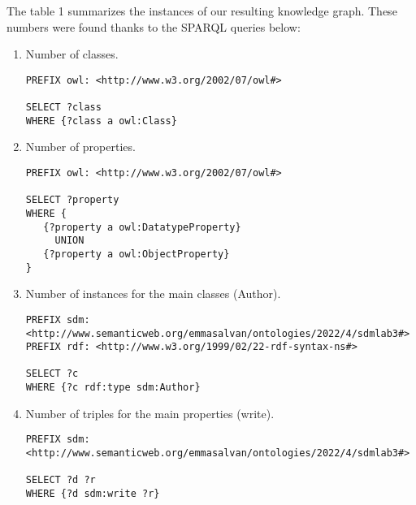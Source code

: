 The table 1 summarizes the instances of our resulting knowledge graph. These numbers were found thanks to the SPARQL queries below: 
\begin{enumerate}
\item Number of classes.
\begin{verbatim}
PREFIX owl: <http://www.w3.org/2002/07/owl#>

SELECT ?class 
WHERE {?class a owl:Class}
\end{verbatim}
\item Number of properties.
\begin{verbatim}
PREFIX owl: <http://www.w3.org/2002/07/owl#>

SELECT ?property 
WHERE {
   {?property a owl:DatatypeProperty}
     UNION
   {?property a owl:ObjectProperty}
}
\end{verbatim}
\item Number of instances for the main classes (Author).
\begin{verbatim}
PREFIX sdm: <http://www.semanticweb.org/emmasalvan/ontologies/2022/4/sdmlab3#>
PREFIX rdf: <http://www.w3.org/1999/02/22-rdf-syntax-ns#>

SELECT ?c
WHERE {?c rdf:type sdm:Author}
\end{verbatim}
\item Number of triples for the main properties (write).
\begin{verbatim}
PREFIX sdm: <http://www.semanticweb.org/emmasalvan/ontologies/2022/4/sdmlab3#>

SELECT ?d ?r
WHERE {?d sdm:write ?r}
\end{verbatim}
\end{enumerate}

